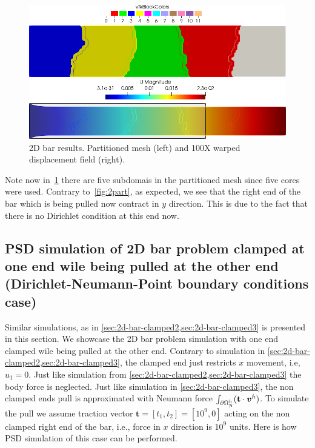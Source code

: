 \documentclass{report}
\newcommand{\bvh}{\boldsymbol v^h}
\begin{document}
\begin{figure}[htbp]
    \centering
    \begin{minipage}[t][2cm][t]{0.36\textwidth}
    \includegraphics[align=b,width=1\textwidth]{2d-bar-partitioned5.png}
    \end{minipage}\hspace{.1\textwidth}
    \begin{minipage}[t][2cm][t]{0.5\textwidth}
    \includegraphics[align=b,width=1\textwidth]{2d-bar-clamped-traction.png}
    \end{minipage}
    \caption{2D bar results. Partitioned mesh (left) and 100X warped displacement field (right).}
    \label{fig:5part}
\end{figure}

Note now in~\cref{fig:5part} there are five subdomais in the partitioned mesh since five cores were used. Contrary to~\cref{fig:2part}, as expected, we see that the right end of the bar which is being pulled now contract in $y$ direction. This is due to the fact that there is no Dirichlet condition at this end now. 

\pagebreak




\subsection{PSD simulation of 2D bar problem clamped at one end wile being pulled at the other end (Dirichlet-Neumann-Point boundary conditions case)\label{sec:2d-bar-clamped4}}


Similar simulations, as in \cref{sec:2d-bar-clamped2,sec:2d-bar-clamped3} is presented in this section. We showcase the 2D bar problem simulation with one end clamped  wile being pulled at the other end. Contrary to simulation in \cref{sec:2d-bar-clamped2,sec:2d-bar-clamped3}, the clamped end just restricts $x$ movement, i.e, $u_1=0$. Just like simulation from \cref{sec:2d-bar-clamped2,sec:2d-bar-clamped3} the body force is neglected. Just like simulation in  \cref{sec:2d-bar-clamped3}, the non clamped ends pull is approximated with Neumann force $\int_{\partial\Omega^h_{\text N}}(\mathbf t\cdot \bvh)$. To simulate the pull we assume traction vector $\mathbf t=[t_1,t_2]=[10^9,0]$ acting on the non clamped right end of the bar, i.e., force in $x$ direction is $10^9$ units. Here is how PSD simulation of this case can be performed.
\end{document}
